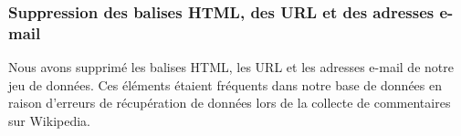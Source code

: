 \subsubsection*{Suppression des balises HTML, des URL et des adresses e-mail}

Nous avons supprimé les balises HTML, les URL et les adresses e-mail de notre jeu de données. Ces éléments étaient fréquents dans notre base de données en raison d'erreurs de récupération de données lors de la collecte de commentaires sur Wikipedia.


